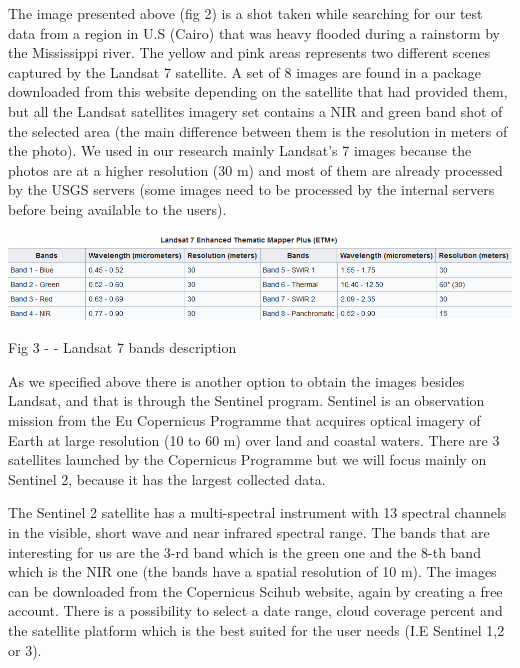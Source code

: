 \documentclass[12pt, a4paper]{report}
\begin{document}
The image presented above (fig 2) is a shot taken while searching for our test data from a region in U.S (Cairo) that was heavy flooded during a rainstorm by the Mississippi river. The yellow and pink areas represents two different scenes captured by the Landsat 7 satellite. A set of 8 images are found in a package downloaded from this website depending on the satellite that had provided them, but all the Landsat satellites imagery set contains a NIR and green band shot of the selected area (the main difference between them is the resolution in meters of the photo). We used in our research mainly Landsat's 7 images because the photos are at a higher resolution (30 m) and most of them are already processed by the USGS servers (some images need to be processed by the internal servers before being available to the users).

\includegraphics[scale=0.73, center]{Capture.png} 
\begin{center}
Fig 3 - \cite{Wiki_landsat} - Landsat 7 bands description
\end{center}


\medskip

As we specified above there is another option to obtain the images besides Landsat, and that is through the Sentinel program. Sentinel is an observation mission from the Eu Copernicus Programme that acquires optical imagery of Earth at large resolution (10 to 60 m) over land and coastal waters. There are 3 satellites launched by the Copernicus Programme but we will focus mainly on Sentinel 2, because it has the largest collected data. 
\par 

The Sentinel 2 satellite has a multi-spectral instrument with 13 spectral channels in the visible, short wave and near infrared spectral range. The bands that are interesting for us are the 3-rd band which is the green one and the 8-th band which is the NIR one (the bands have a spatial resolution of 10 m). The images  can be downloaded from the Copernicus Scihub website, again by creating a free account. There is a possibility to select a date range, cloud coverage percent and the satellite platform which is the best suited for the user needs (I.E Sentinel 1,2 or 3). 
\par 
\end{document}
